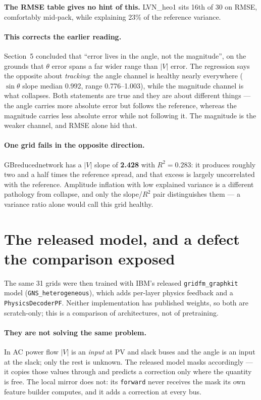 \documentclass[10pt]{article}
\begin{document}
\textbf{The RMSE table gives no hint of this.} LVN\_heo1 sits 16th of 30 on
RMSE, comfortably mid-pack, while explaining 23\% of the reference variance.

\paragraph{This corrects the earlier reading.} Section~5 concluded that ``error
lives in the angle, not the magnitude'', on the grounds that $\theta$ error
spans a far wider range than $|V|$ error. The regression says the opposite about
\emph{tracking}: the angle channel is healthy nearly everywhere
($\sin\theta$ slope median 0.992, range 0.776--1.003), while the magnitude
channel is what collapses. Both statements are true and they are about different
things --- the angle carries more absolute error but follows the reference,
whereas the magnitude carries less absolute error while not following it. The
magnitude is the weaker channel, and RMSE alone hid that.

\paragraph{One grid fails in the opposite direction.} GBreducednetwork has a
$|V|$ slope of \textbf{2.428} with $R^2 = 0.283$: it produces roughly two and a
half times the reference spread, and that excess is largely uncorrelated with
the reference. Amplitude inflation with low explained variance is a different
pathology from collapse, and only the slope/$R^2$ pair distinguishes them --- a
variance ratio alone would call this grid healthy.


\section{The released model, and a defect the comparison exposed}
\label{sec:graphkit}

The same 31 grids were then trained with IBM's released
\texttt{gridfm\_graphkit} model (\texttt{GNS\_heterogeneous}), which adds
per-layer physics feedback and a \texttt{PhysicsDecoderPF}. Neither
implementation has published weights, so both are scratch-only; this is a
comparison of architectures, not of pretraining.

\paragraph{They are not solving the same problem.} In AC power flow $|V|$ is an
\emph{input} at PV and slack buses and the angle is an input at the slack; only
the rest is unknown. The released model masks accordingly --- it copies those
values through and predicts a correction only where the quantity is free. The
local mirror does not: its \texttt{forward} never receives the mask its own
feature builder computes, and it adds a correction at every bus.
\end{document}
